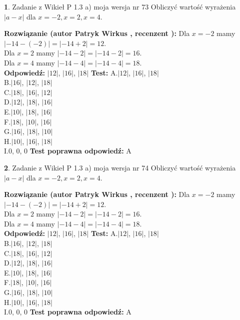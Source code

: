 \documentclass[12pt, a4paper]{article}
\theoremstyle{definition} %
\newtheorem{zad}{}
\newcommand{\zadStart}[1]{\begin{zad}#1\newline}
\newcommand{\zadStop}{\end{zad}}
\newcommand{\rozwStart}[2]{\noindent \textbf{Rozwiązanie (autor #1 , recenzent #2): }\newline}
\newcommand{\rozwStop}{\newline}
\newcommand{\odpStart}{\noindent \textbf{Odpowiedź:}\newline}
\newcommand{\odpStop}{\newline}
\newcommand{\testStart}{\noindent \textbf{Test:}\newline}
\newcommand{\testStop}{\newline}
\newcommand{\kluczStart}{\noindent \textbf{Test poprawna odpowiedź:}\newline}
\newcommand{\kluczStop}{\newline}
\begin{document}
\zadStart{Zadanie z Wikieł P 1.3 a) moja wersja nr 73}
Obliczyć wartość wyrażenia $|a - x|$ dla $x=-2,x=2,x=4$.
\zadStop
\rozwStart{Patryk Wirkus}{}
Dla $x = -2$ mamy $|-14 - (-2)| = |-14 + 2| = 12$.\\
Dla $x = 2$ mamy $|-14 - 2| = |-14 - 2| = 16$.\\
Dla $x = 4$ mamy $|-14 - 4| = |-14 - 4| = 18$.\\
\rozwStop
\odpStart
$|12|$, $|16|$, $|18|$
\odpStop
\testStart
A.$|12|$, $|16|$, $|18|$\\
B.$|16|$, $|12|$, $|18|$\\
C.$|18|$, $|16|$, $|12|$\\
D.$|12|$, $|18|$, $|16|$\\
E.$|10|$, $|18|$, $|16|$\\
F.$|18|$, $|10|$, $|16|$\\
G.$|16|$, $|18|$, $|10|$\\
H.$|10|$, $|16|$, $|18|$\\
I.$0$, $0$, $0$
\testStop
\kluczStart
A
\kluczStop



\zadStart{Zadanie z Wikieł P 1.3 a) moja wersja nr 74}
Obliczyć wartość wyrażenia $|a - x|$ dla $x=-2,x=2,x=4$.
\zadStop
\rozwStart{Patryk Wirkus}{}
Dla $x = -2$ mamy $|-14 - (-2)| = |-14 + 2| = 12$.\\
Dla $x = 2$ mamy $|-14 - 2| = |-14 - 2| = 16$.\\
Dla $x = 4$ mamy $|-14 - 4| = |-14 - 4| = 18$.\\
\rozwStop
\odpStart
$|12|$, $|16|$, $|18|$
\odpStop
\testStart
A.$|12|$, $|16|$, $|18|$\\
B.$|16|$, $|12|$, $|18|$\\
C.$|18|$, $|16|$, $|12|$\\
D.$|12|$, $|18|$, $|16|$\\
E.$|10|$, $|18|$, $|16|$\\
F.$|18|$, $|10|$, $|16|$\\
G.$|16|$, $|18|$, $|10|$\\
H.$|10|$, $|16|$, $|18|$\\
I.$0$, $0$, $0$
\testStop
\kluczStart
A
\kluczStop
\end{document}
